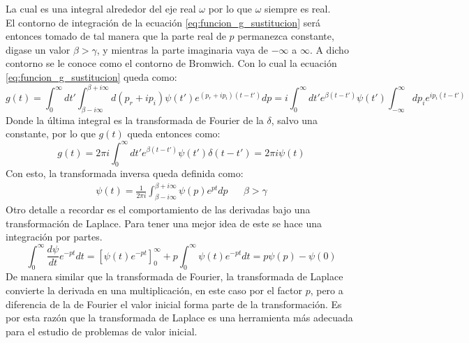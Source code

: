 \documentclass[../tesis_main_file.tex]{subfiles}
\begin{document}
La cual es una integral alrededor del eje real $ \omega$ por lo que $\omega$ siempre es real.\\
El contorno de integración de la ecuación \ref{eq:funcion_g_sustitucion} será entonces tomado de tal manera que la parte real de $p$ permanezca constante, digase un valor $\beta > \gamma$, y mientras la parte imaginaria vaya de $- \infty$ a $\infty$. A dicho contorno se le conoce como el contorno de Bromwich.\cite{bellan2008fundamentals,arfken2011mathematical} 
Con lo cual la ecuación \ref{eq:funcion_g_sustitucion} queda como:
\begin{equation}
g(t) = \int _0^{\infty} dt' \int ^{\beta +i \infty}_{\beta - i\infty}d(p_r + ip_i) \psi (t')e^{(p_r + ip_i)(t-t')}dp = i \int _0^{\infty} dt' e^{\beta (t-t')} \psi(t') \int ^{\infty}_{-\infty}dp_i e^{ip_i(t-t')}
\end{equation}
Donde la última integral es la transformada de Fourier de la $\delta$, salvo una constante, por lo que $g(t)$ queda entonces como:
\begin{equation}
g(t)= 2 \pi i \int _0^{\infty} dt' e^{\beta (t-t')} \psi(t') \delta(t-t')=2 \pi i \psi (t)
\end{equation}
Con esto, la transformada inversa queda definida como:
\begin{align}
\label{eq:Laplace_inversa}
\psi (t) = \frac{1}{2\pi i} \int ^{\beta +i \infty}_{\beta - i\infty} \psi (p) e^{pt} dp & & \beta > \gamma
\end{align}
Otro detalle a recordar es el comportamiento de las derivadas bajo una transformación de Laplace. Para tener una mejor idea de este se hace una integración por partes.
\begin{equation}
\label{eq:Laplace_transform_derivadas}
\int ^{\infty}_0 \frac{d\psi}{dt}e^{-pt}dt =\left[\psi(t)e^{-pt}\right]^{\infty}_0 +p \int^{\infty}_0\psi(t)e^{-pt}dt= p\psi(p) -\psi(0)
\end{equation}
De manera similar que la transformada de Fourier, la transformada de Laplace convierte la derivada en una multiplicación, en este caso por el factor $p$, pero a diferencia de la de Fourier el valor inicial forma parte de la transformación. Es por esta razón que la transformada de Laplace es una herramienta más adecuada para el estudio de problemas de valor inicial.
\onlyinsubfile{}
\onlyinsubfile{}
\end{document}
